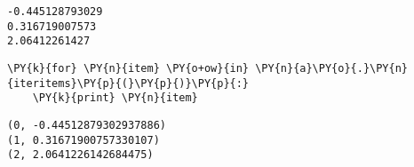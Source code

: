 \par\vspace{1\smallerfontscale}%
    \begin{addmargin}[\cellleftmargin]{0em}%
    {\smaller%
    \vspace{-1\smallerfontscale}%
    
    \begin{Verbatim}[commandchars=\\\{\}]
-0.445128793029
0.316719007573
2.06412261427
    \end{Verbatim}
}%
    \end{addmargin}%

{\par%
\vspace{-1\baselineskip}%
}%
\begin{notebookcell}[21]%
\begin{addmargin}[\cellleftmargin]{0em}%
{\smaller%
\par%
%
\vspace{-1\smallerfontscale}%
\begin{Verbatim}[commandchars=\\\{\}]
\PY{k}{for} \PY{n}{item} \PY{o+ow}{in} \PY{n}{a}\PY{o}{.}\PY{n}{iteritems}\PY{p}{(}\PY{p}{)}\PY{p}{:}
    \PY{k}{print} \PY{n}{item}
\end{Verbatim}
%
\par%
\vspace{-1\smallerfontscale}}%
\end{addmargin}
\end{notebookcell}

\par\vspace{1\smallerfontscale}%
    \begin{addmargin}[\cellleftmargin]{0em}%
    {\smaller%
    \vspace{-1\smallerfontscale}%
    
    \begin{Verbatim}[commandchars=\\\{\}]
(0, -0.44512879302937886)
(1, 0.31671900757330107)
(2, 2.0641226142684475)
    \end{Verbatim}
}%
    \end{addmargin}%

